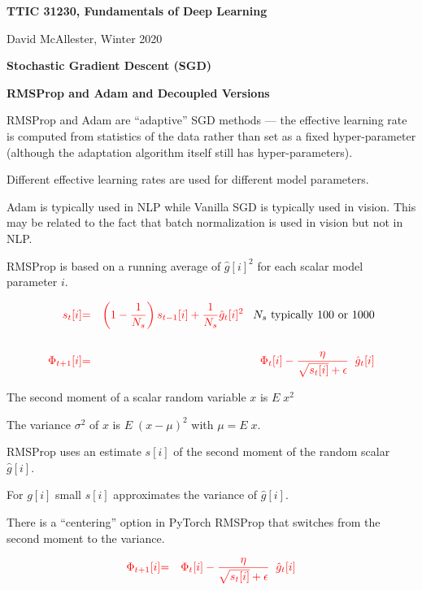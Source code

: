 


\newcommand{\solution}[1]{\bigskip {\bf Solution}: #1}



{\Huge
  \centerline{\bf TTIC 31230, Fundamentals of Deep Learning}
  \bigskip
  \centerline{David McAllester, Winter 2020}
  \vfill
  \centerline{\bf Stochastic Gradient Descent (SGD)}
  \vfill
  \centerline{\bf RMSProp and Adam and Decoupled Versions}


RMSProp and Adam are ``adaptive'' SGD methods --- the effective learning rate is computed from statistics of the data rather than set as a fixed hyper-parameter (although
the adaptation algorithm itself still has hyper-parameters).

\vfill
Different effective learning rates are used for different model parameters.

\vfill
Adam is typically used in NLP while Vanilla SGD is typically used in vision.  This may be related to the fact that batch normalization is used in vision but not in NLP.


RMSProp is based on a running average of $\hat{g}[i]^2$ for each scalar model parameter $i$.

\begin{eqnarray*}
{\color{red} s_t[i]} & {\color{red} =} & {\color{red} \left(1-\frac{1}{N_s}\right) s_{t-1}[i] + \frac{1}{N_s} \hat{g}_t[i]^2}\;\;\;\mbox{$N_s$ typically 100 or 1000} \\
\\
{\color{red} \Phi_{t+1}[i]} & {\color{red} =} & {\color{red} \Phi_t[i] - \frac{\eta}{\sqrt{s_t[i]} + \epsilon}\;\; \hat{g}_t[i]}
\end{eqnarray*}

The second moment of a scalar random variable $x$ is $E\;x^2$

\vfill
The variance $\sigma^2$ of $x$ is $E \;(x - \mu)^2$ with $\mu = E\;x$.

\vfill
RMSProp uses an estimate $s[i]$ of the second moment of the random scalar $\hat{g}[i]$.

\vfill
For $g[i]$ small $s[i]$ approximates the variance of $\hat{g}[i]$.

\vfill
There is a ``centering'' option in PyTorch RMSProp that switches from the second moment to the variance.

\begin{eqnarray*}
{\color{red} \Phi_{t+1}[i]} & {\color{red} =} & {\color{red} \Phi_t[i] - \frac{\eta}{\sqrt{s_t[i]} + \epsilon}\;\; \hat{g}_t[i]}
\end{eqnarray*}

}
